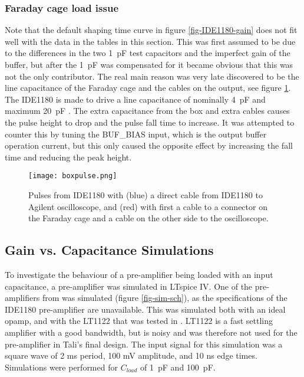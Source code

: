 \documentclass[../main/thesis.tex]{subfiles}
\begin{document}
\subsubsection{Faraday cage load issue}
Note that the default shaping time curve in figure \ref{fig-IDE1180-gain} does not fit well with the data in the tables in this section. This was first assumed to be due to the differences in the two 1~pF test capacitors and the imperfect gain of the buffer, but after the 1~pF was compensated for it became obvious that this was not the only contributor. The real main reason was very late discovered to be the line capacitance of the Faraday cage and the cables on the output, see figure \ref{fig-box-pulse}. The IDE1180 is made to drive a line capacitance of nominally 4~pF and maximum 20~pF \citep{IDE1180}. The extra capacitance from the box and extra cables causes the pulse height to drop and the pulse fall time to increase. It was attempted to counter this by tuning the BUF\_BIAS input, which is the output buffer operation current, but this only caused the opposite effect by increasing the fall time and reducing the peak height. 


\begin{figure}[h]
	\centering
	\texttt{[image: boxpulse.png]}
	\caption{Pulses from IDE1180 with (blue) a direct cable from IDE1180 to Agilent oscilloscope, and (red) with first a cable to a connector on the Faraday cage and a cable on the other side to the oscilloscope.}
	\label{fig-box-pulse}
\end{figure} 

\newpage
\subsection{Gain vs. Capacitance Simulations}

To investigate the behaviour of a pre-amplifier being loaded with an input capacitance, a pre-amplifier was simulated in LTspice IV. One of the pre-amplifiers from \citep{tali} was simulated (figure \ref{fig-sim-sch}), as the specifications of the IDE1180 pre-amplifier are unavailable. This was simulated both with an ideal \gls{opamp}, and with the LT1122 that was tested in \citep{tali}. LT1122 is a fast settling amplifier with a good bandwidth, but is noisy and was therefore not used for the pre-amplifier in Tali's final design. The input signal for this simulation was a square wave of 2 ms period, 100 mV amplitude, and 10 ns edge times. Simulations were performed for $C_{load}$ of 1~pF and 100~pF.  
\end{document}
